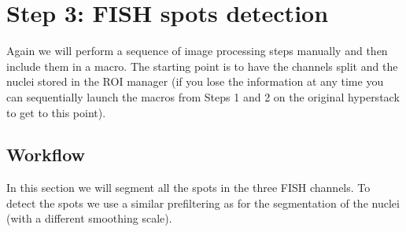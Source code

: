 \documentclass[11pt,a4paper,oneside]{report}
\begin{document}
 
\newpage
\section{Step 3: FISH spots detection} 

Again we will perform a sequence of image processing steps manually and then include them in a macro. The starting point is to have the channels split and the nuclei stored in the ROI manager (if you lose the information at any time you can sequentially launch the macros from Steps 1 and 2 on the original hyperstack to get to this point).

\subsection{Workflow}
In this section we will segment all the spots in the three FISH channels. To detect the spots we use a similar prefiltering as for the segmentation of the nuclei (with a different smoothing scale).
\end{document}
